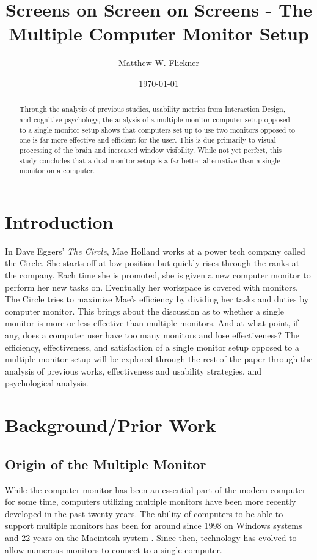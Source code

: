 \documentclass[a4paper]{article}
\title{Screens on Screen on Screens - The Multiple Computer Monitor Setup}
\author{Matthew W. Flickner}
\date{\today}
\begin{document}
\maketitle

\begin{abstract}
Through the analysis of previous studies, usability metrics from Interaction Design, and cognitive psychology, the analysis of a multiple monitor computer setup opposed to a single monitor setup shows that computers set up to use two monitors opposed to one is far more effective and efficient for the user. This is due primarily to visual processing of the brain and increased window visibility. While not yet perfect, this study concludes that a dual monitor setup is a far better alternative than a single monitor on a computer.
\end{abstract}

\section{Introduction}
In Dave Eggers' \emph{The Circle}\/, Mae Holland works at a power tech company called the Circle. She starts off at low position but quickly rises through the ranks at the company. Each time she is promoted, she is given a new computer monitor to perform her new tasks on. Eventually her workspace is covered with monitors. The Circle tries to maximize Mae's efficiency by dividing her tasks and duties by computer monitor. This brings about the discussion as to whether a single monitor is more or less effective than multiple monitors. And at what point, if any, does a computer user have too many monitors and lose effectiveness? The efficiency, effectiveness, and satisfaction of a single monitor setup opposed to a multiple monitor setup will be explored through the rest of the paper through the analysis of previous works, effectiveness and usability strategies, and psychological analysis.

\section{Background/Prior Work}
\subsection{Origin of the Multiple Monitor}
While the computer monitor has been an essential part of the modern computer for some time, computers utilizing multiple monitors have been more recently developed in the past twenty years. The ability of computers to be able to support multiple monitors has been for around since 1998 on Windows systems and 22 years on the Macintosh system \cite{Grudin}.  Since then, technology has evolved to allow numerous monitors to connect to a single computer.
\end{document}

